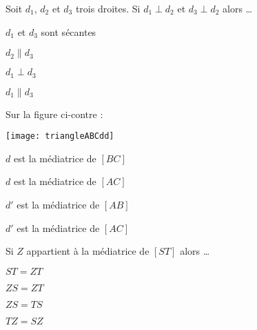  
 \begin{QCM}
  \begin{GroupeQCM}
    \begin{exercice}
     Soit $d_1$, $d_2$ et $d_3$ trois droites. Si $d_1 \perp d_2$ et $d_3 \perp d_2$ alors \ldots
      \begin{ChoixQCM}{4}
      \item $d_1$ et $d_3$ sont sécantes
      \item $d_2 \parallel d_3$
      \item $d_1 \perp d_3$
      \item $d_1 \parallel d_3$
      \end{ChoixQCM}
\begin{corrige}
   \end{corrige}
    \end{exercice}
    
    
  \begin{exercice}
     Sur la figure ci-contre : \vspace{-2em}\begin{center}\texttt{[image: triangleABCdd]}\end{center}\vspace{-1em}
      \begin{ChoixQCM}{4}
      \item $d$ est la médiatrice de $[BC]$
      \item $d$ est la médiatrice de $[AC]$
      \item $d'$ est la médiatrice de $[AB]$
      \item $d'$ est la médiatrice de $[AC]$
      \end{ChoixQCM}
\begin{corrige}
   \end{corrige}
    \end{exercice}

     \begin{exercice}
     Si $Z$ appartient à la médiatrice de $[ST]$ alors \ldots
      \begin{ChoixQCM}{4}
      \item $ST = ZT$
      \item $ZS = ZT$
      \item $ZS = TS$
      \item $TZ = SZ$
      \end{ChoixQCM}
\begin{corrige}
   \end{corrige}
    \end{exercice}
    


\end{GroupeQCM}
\end{QCM}
